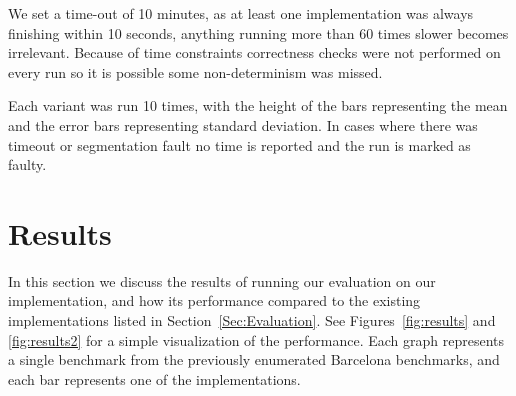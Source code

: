 \documentclass[sigconf]{acmart}
\begin{document}
We set a time-out of 10 minutes, as at least one implementation was always
finishing within 10 seconds, anything running more than 60 times slower becomes
irrelevant.  Because of time constraints correctness checks were not performed on
every run so it is possible some non-determinism was missed. 

Each variant was run 10 times, with the height of the bars representing the
mean and the error bars representing standard deviation. In cases where there
was timeout or segmentation fault no time is reported and the run is marked
as faulty. 

\section{Results} \label{Sec:Results}

In this section we discuss the results of running our evaluation on our
implementation, and how its performance compared to the existing
implementations listed in Section~\ref{Sec:Evaluation}. See
Figures~\ref{fig:results} and \ref{fig:results2} for a simple visualization of
the performance. Each graph represents a single benchmark from the previously
enumerated Barcelona benchmarks, and each bar represents one of the
implementations. 
\end{document}
